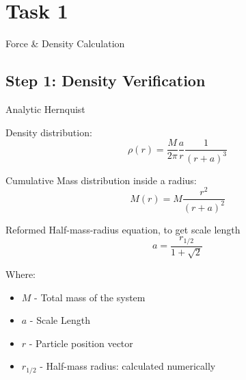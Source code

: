 \section{Task 1}
\begin{frame}[plain]
	\huge{Force \& Density Calculation}
\end{frame}

\subsection{Step 1: Density Verification}

\begin{frame}{Analytic Hernquist}

	Density distribution:
	\begin{equation}
		\rho(r) = \frac{M}{2\pi}\frac{a}{r}\frac{1}{(r+a)^3}
	\end{equation}

	Cumulative Mass distribution inside a radius:
	\begin{equation}
		M(r) = M \frac{r^2}{(r+a)^2}
		\label{eq:cumulative-mass-distribution}
	\end{equation}

	Reformed Half-mass-radius equation, to get scale length
	\begin{equation}
		a = \frac{r_{1/2}}{1+\sqrt 2}
	\end{equation}

	{\footnotesize Where:
	\begin{itemize}
		\item $M$  - Total mass of the system
		\item $a$ - Scale Length
		\item $r$ - Particle position vector
		\item $r_{1/2}$ - Half-mass radius: calculated numerically
	\end{itemize}}
\end{frame}

